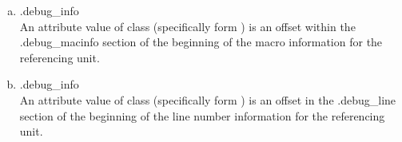 \begin{enumerate}[(a)]
\item .debug\_info \\
An attribute value of class  (specifically form
) is an offset within the .debug\_macinfo section
of the beginning of the macro information for the referencing unit.


\item .debug\_info \\
An attribute value of class  (specifically form
) is an offset in the .debug\_line section of the
beginning of the line number information for the referencing unit.
\end{enumerate}



